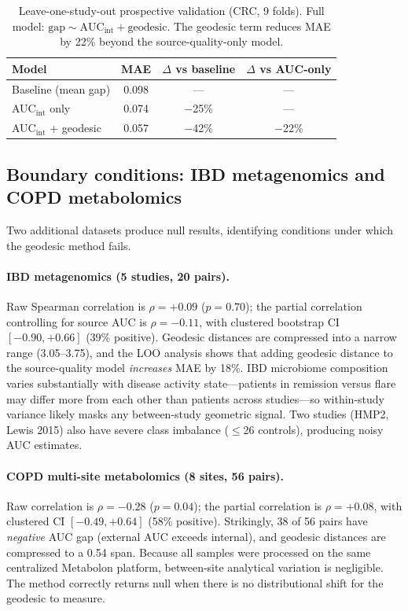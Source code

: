 \documentclass{article}
\begin{document}
\begin{table}[t]
\centering
\caption{Leave-one-study-out prospective validation (CRC, 9 folds). Full model: $\text{gap} \sim \text{AUC}_{\mathrm{int}} + \text{geodesic}$. The geodesic term reduces MAE by 22\% beyond the source-quality-only model.}
\label{tab:loo}
\begin{tabular}{lccc}
\toprule
Model & MAE & $\Delta$ vs baseline & $\Delta$ vs AUC-only \\
\midrule
Baseline (mean gap) & 0.098 & --- & --- \\
AUC$_{\mathrm{int}}$ only & 0.074 & $-$25\% & --- \\
AUC$_{\mathrm{int}}$ + geodesic & 0.057 & $-$42\% & $-$22\% \\
\bottomrule
\end{tabular}
\end{table}


\subsection{Boundary conditions: IBD metagenomics and COPD metabolomics}
\label{sec:boundary}

Two additional datasets produce null results, identifying conditions under which the geodesic method fails.

\paragraph{IBD metagenomics (5 studies, 20 pairs).} Raw Spearman correlation is $\rho = +0.09$ ($p = 0.70$); the partial correlation controlling for source AUC is $\rho = -0.11$, with clustered bootstrap CI $[-0.90, +0.66]$ (39\% positive). Geodesic distances are compressed into a narrow range (3.05--3.75), and the LOO analysis shows that adding geodesic distance to the source-quality model \emph{increases} MAE by 18\%. IBD microbiome composition varies substantially with disease activity state---patients in remission versus flare may differ more from each other than patients across studies---so within-study variance likely masks any between-study geometric signal. Two studies (HMP2, Lewis 2015) also have severe class imbalance ($\leq$26 controls), producing noisy AUC estimates.

\paragraph{COPD multi-site metabolomics (8 sites, 56 pairs).} Raw correlation is $\rho = -0.28$ ($p = 0.04$); the partial correlation is $\rho = +0.08$, with clustered CI $[-0.49, +0.64]$ (58\% positive). Strikingly, 38 of 56 pairs have \emph{negative} AUC gap (external AUC exceeds internal), and geodesic distances are compressed to a 0.54 span. Because all samples were processed on the same centralized Metabolon platform, between-site analytical variation is negligible. The method correctly returns null when there is no distributional shift for the geodesic to measure.
\end{document}
